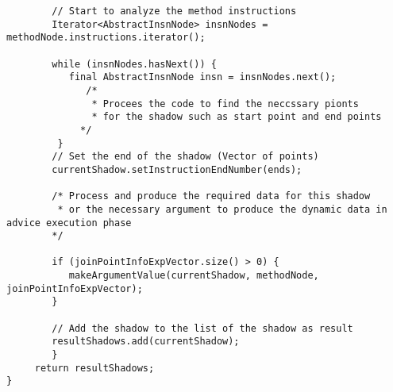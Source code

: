 \documentclass{report}
\begin{document}
\begin{verbatim}
	   	// Start to analyze the method instructions
	   	Iterator<AbstractInsnNode> insnNodes = methodNode.instructions.iterator();
	   	
	   	while (insnNodes.hasNext()) {
	   	   final AbstractInsnNode insn = insnNodes.next();
	   	      /* 
	   	       * Procees the code to find the neccssary pionts 
	   	       * for the shadow such as start point and end points
	   	     */
	   	 }
	   	// Set the end of the shadow (Vector of points)
	   	currentShadow.setInstructionEndNumber(ends);
	   	
	   	/* Process and produce the required data for this shadow
	   	 * or the necessary argument to produce the dynamic data in advice execution phase
	   	*/
	   	
	   	if (joinPointInfoExpVector.size() > 0) {
	   	   makeArgumentValue(currentShadow, methodNode, joinPointInfoExpVector);
	   	}
	   	
	   	// Add the shadow to the list of the shadow as result
	   	resultShadows.add(currentShadow);
	   	}
	 return resultShadows;
}

\end{verbatim}
\end{document}
